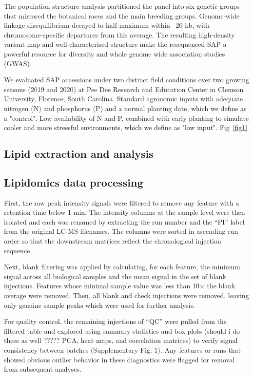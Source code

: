 \documentclass[10pt,letterpaper]{article}
\begin{document}
The population structure analysis partitioned the panel into six genetic groups that mirrored the botanical races and the main breeding groups. Genome‑wide linkage disequilibrium decayed to half‑maximum within ~20 kb, with chromosome‑specific departures from this average. The resulting high‑density variant map and well‑characterised structure make the resequenced SAP a powerful resource for diversity and whole genome wide association studies (GWAS).


We evaluated SAP accessions under two distinct field conditions over two growing seasons (2019 and 2020) at Pee Dee Research and Education Center in Clemson University, Florence, South Carolina. Standard agronomic inputs with adequate nitrogen (N) and phosphorus (P) and a normal planting date, which we define as a "control". Low availability of N and P, combined with early planting to simulate cooler and more stressful environments, which we define as "low input". Fig~\ref{fig1}


\subsection*{Lipid extraction and analysis}


\subsection*{Lipidomics data processing}
First, the raw peak intensity signals were filtered to remove any feature with a retention time below 1 min. The intensity columns at the sample level were then isolated and each was renamed by extracting the run number and the “PI” label from the original LC-MS filenames. The columns were sorted in ascending run order so that the downstream matrices reflect the chronological injection sequence.

Next, blank filtering was applied by calculating, for each feature, the minimum signal across all biological samples and the mean signal in the set of blank injections. Features whose minimal sample value was less than 10× the blank average were removed. Then, all blank and check injections were removed, leaving only genuine sample peaks which were used for further analysis.

For quality control, the remaining injections of “QC” were pulled from the filtered table and explored using summary statistics and box plots (should i do these as well ????? PCA, heat maps, and correlation matrices) to verify signal consistency between batches (Supplementary Fig. 1). Any features or runs that showed obvious outlier behavior in these diagnostics were flagged for removal from subsequent analyses.
\end{document}
